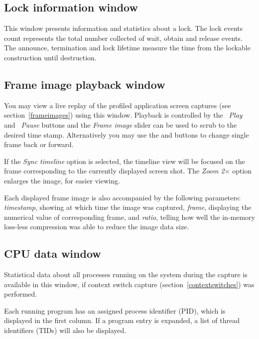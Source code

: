 \documentclass[hidelinks,titlepage,a4paper]{article}
\begin{document}
\subsection{Lock information window}
\label{lockwindow}

This window presents information and statistics about a lock. The lock events count represents the total number collected of wait, obtain and release events. The announce, termination and lock lifetime measure the time from the lockable construction until destruction.

\subsection{Frame image playback window}
\label{playback}

You may view a live replay of the profiled application screen captures (see section~\ref{frameimages}) using this window. Playback is controlled by the \emph{\faPlay~Play} and \emph{\faPause~Pause} buttons and the \emph{Frame image} slider can be used to scrub to the desired time stamp. Alternatively you may use the \emph{\faCaretLeft} and \emph{\faCaretRight} buttons to change single frame back or forward.

If the \emph{Sync timeline} option is selected, the timeline view will be focused on the frame corresponding to the currently displayed screen shot. The \emph{Zoom 2$\times$} option enlarges the image, for easier viewing.

Each displayed frame image is also accompanied by the following parameters: \emph{timestamp}, showing at which time the image was captured, \emph{frame}, displaying the numerical value of corresponding frame, and \emph{ratio}, telling how well the in-memory loss-less compression was able to reduce the image data size.

\subsection{CPU data window}
\label{cpudata}

Statistical data about all processes running on the system during the capture is available in this window, if context switch capture (section~\ref{contextswitches}) was performed.

Each running program has an assigned process identifier (PID), which is displayed in the first column. If a program entry is expanded, a list of thread identifiers (TIDs) will also be displayed.
\end{document}
